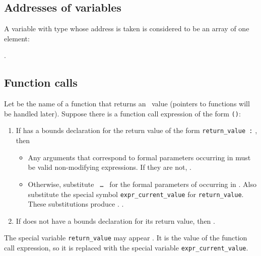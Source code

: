 \subsection{Addresses of variables}\label{addresses-of-variables}

A variable with type  whose address is taken is considered to be
an array of one element:

            {}.

\subsection{Function calls}\label{function-calls}

Let  be the name of a function that returns an
\arrayptr\ value (pointers to functions will be handled later).
Suppose there is a function call expression of the form
\texttt{(}\texttt{)}:

\begin{enumerate}
\item
  If  has a bounds declaration for the return value of the form
  \texttt{return\_value :} , then

  \begin{itemize}
  \item
    Any arguments that correspond to formal parameters occurring in
     must be valid non-modifying expressions. If they are
    not, .
  \item
    Otherwise, substitute \texttt{ \ldots{} } for the formal
    parameters of  occurring in . Also substitute the
    special symbol \texttt{expr\_current\_value} for
    \texttt{return\_value}. These substitutions produce .
    .
  \end{itemize}
\item
  If  does not have a bounds declaration for its return value,
  then .
\end{enumerate}

The special variable \texttt{return\_value} may appear . It
is the value of the function call expression, so it is replaced with the
special variable \texttt{expr\_current\_value}.

